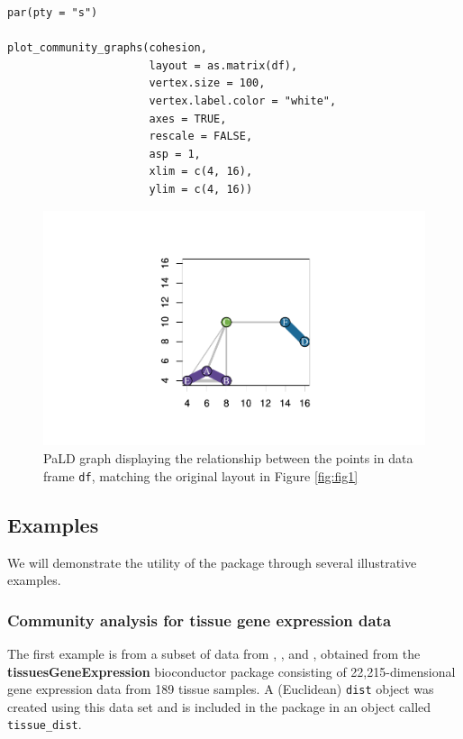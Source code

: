 \begin{verbatim}
par(pty = "s")

plot_community_graphs(cohesion,
                      layout = as.matrix(df),
                      vertex.size = 100,
                      vertex.label.color = "white",
                      axes = TRUE,
                      rescale = FALSE,
                      asp = 1,
                      xlim = c(4, 16),
                      ylim = c(4, 16))
\end{verbatim}

\begin{figure}[H]
\centering
\includegraphics[width=4.6in,trim=1in .6in 1in .68in,clip]{dagostino-mcgowan_files/figure-latex/fig3-1.pdf}
\caption{\label{fig:fig3}PaLD graph displaying the relationship between the points in data frame \texttt{df}, matching the original layout in Figure \ref{fig:fig1}}
\end{figure}

\hypertarget{examples}{%
\subsection{Examples}\label{examples}}

We will demonstrate the utility of the  package through several illustrative examples.

\hypertarget{community-analysis-for-tissue-gene-expression-data}{%
\subsubsection{Community analysis for tissue gene expression data}\label{community-analysis-for-tissue-gene-expression-data}}

The first example is from a subset of data from \citet{zilliox2007gene}, \citet{mccall2011gene}, and \citet{mccall2014gene}, obtained from the \textbf{tissuesGeneExpression} bioconductor package \citep{tissue} consisting of 22,215-dimensional gene expression data from 189 tissue samples. A (Euclidean) \texttt{dist} object was created using this data set and is included in the  package in an object called \texttt{tissue\_dist}.

